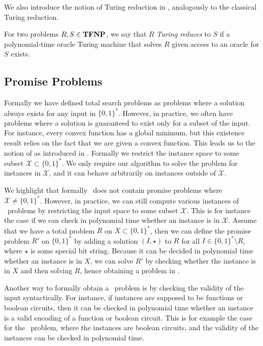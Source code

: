 We also introduce the notion of Turing reduction in \TFNP, analogously to the classical Turing reduction.

\begin{definition}
    For two problems $R, S \in \textbf{TFNP}$, we say that $R$ \emph{Turing reduces} to $S$ if a polynomial-time oracle Turing machine that solves $R$ given access to an oracle for $S$ exists.
\end{definition}

\subsection{Promise Problems}

Formally we have defined total search problems as problems where a solution always exists for any input in $\{0, 1\}^*$. However, in practice, we often have problems where a solution is guaranteed to exist only for a subset of the input. For instance, every convex function has a global minimum, but this existence result relies on the fact that we are given a convex function. This leads us to the notion of  as introduced in . Formally we restrict the instance space to some subset $\mathcal{X} \subset \{0, 1\}^*$. We only require our algorithm to solve the problem for instances in $\mathcal{X}$, and it can behave arbitrarily on instances outside of $\mathcal{X}$.

We highlight that formally \TFNP\ does not contain promise problems where $\mathcal{X} \neq \{0, 1\}^*$. However, in practice, we can still compute various instances of \TFNP\ problems by restricting the input space to some subset $\mathcal{X}$. This is for instance the case if we can check in polynomial time whether an instance is in $\mathcal{X}$. Assume that we have a total problem $R$ on $X \subset \{0, 1\}^*$, then we can define the promise problem $R'$ on $\{0, 1\}^*$ by adding a solution $(I, \star)$ to $R$ for all $I \in \{0, 1\}^* \setminus R$, where $\star$ is some special bit string. Because it can be decided in polynomial time whether an instance is in $X$, we can solve $R'$ by checking whether the instance is in $X$ and then solving $R$, hence obtaining a problem in \TFNP.

Another way to formally obtain a \TFNP\ problem is by checking the validity of the input syntactically. For instance, if instances are supposed to be functions or boolean circuits, then it can be checked in polynomial time whether an instance is a valid encoding of a function or boolean circuit. This is for example the case for the \Tarski\ problem, where the instances are boolean circuits, and the validity of the instances can be checked in polynomial time.

